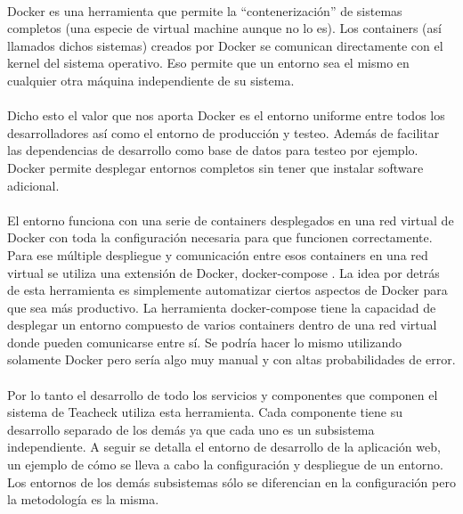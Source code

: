 \paragraph{}
Docker es una herramienta que permite la “contenerización” de sistemas
completos (una especie de virtual machine aunque no lo es). Los
containers (así llamados dichos sistemas) creados por Docker se
comunican directamente con el kernel del sistema operativo. Eso
permite que un entorno sea el mismo en cualquier otra máquina
independiente de su sistema.

\paragraph{}
Dicho esto el valor que nos aporta Docker es el entorno uniforme entre
todos los desarrolladores así como el entorno de producción y
testeo. Además de facilitar las dependencias de desarrollo como base
de datos para testeo por ejemplo. Docker permite desplegar entornos
completos sin tener que instalar software adicional.

\paragraph{}
El entorno funciona con una serie de containers desplegados en una red
virtual de Docker con toda la configuración necesaria para que
funcionen correctamente. Para ese múltiple despliegue y comunicación
entre esos containers en una red virtual se utiliza una extensión de
Docker, docker-compose \cite{dockercomposeDocs}. La idea por detrás de esta herramienta es
simplemente automatizar ciertos aspectos de Docker para que sea más
productivo. La herramienta docker-compose tiene la capacidad de
desplegar un entorno compuesto de varios containers dentro de una red
virtual donde pueden comunicarse entre sí. Se podría hacer lo mismo
utilizando solamente Docker pero sería algo muy manual y con altas
probabilidades de error.

\paragraph{}
Por lo tanto el desarrollo de todo los servicios y componentes que
componen el sistema de Teacheck utiliza esta herramienta. Cada
componente tiene su desarrollo separado de los demás ya que cada uno
es un subsistema independiente. A seguir se detalla el entorno de
desarrollo de la aplicación web, un ejemplo de cómo se lleva a cabo la
configuración y despliegue de un entorno. Los entornos de los demás
subsistemas sólo se diferencian en la configuración pero la
metodología es la misma.

